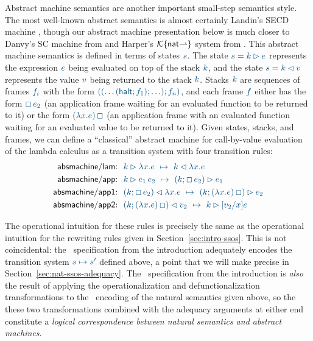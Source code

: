 Abstract machine semantics are another important small-step semantics
style. The most well-known abstract semantics is almost certainly
Landin's SECD machine \cite{landin64mechanical}, though our abstract
machine presentation below is much closer to Danvy's SC machine from
\cite{danvy03rational} and Harper's $\mathcal K\{{\sf
  nat}{\rightharpoonup}\}$ system from \cite[Chapter
27]{harper12practical}.  This abstract machine semantics is defined in
terms of states $\obj{s}$. The state $\obj{s} = \obj{k \rhd e}$
represents the expression $\obj{e}$ being evaluated on top of the
stack $\obj{k}$, and the state $\obj{s} = \obj{k \lhd v}$ represents
the value $\obj{v}$ being returned to the stack $\obj{k}$. Stacks
$\obj{k}$ are sequences of frames $\obj{f_i}$ with the form $\obj{((\ldots({\sf
  halt}; f_1); \ldots); f_n)}$, and each frame $\obj{f}$ either has the form
$\obj{\Box\,e_2}$ (an application frame waiting for an evaluated function to
be returned to it) or the form $\obj{(\lambda x.e)\,\Box}$ (an application
frame with an evaluated function waiting for an evaluated value to be
returned to it). Given states, stacks, and frames, we can define a
``classical'' abstract machine for call-by-value evaluation of the
lambda calculus as a transition system with four transition rules:
\begin{align*}
{\sf absmachine/lam}{:} & ~~ 
 \obj{k \rhd \lambda x.e ~ \mapsto ~ k \lhd \lambda x.e}
\\
{\sf absmachine/app}{:} & ~~ 
 \obj{k \rhd e_1\,e_2 ~ \mapsto ~ (k; \Box\,e_2) \rhd e_1}
\\
{\sf absmachine/app1}{:} & ~~ 
 \obj{(k; \Box\,e_2) \lhd \lambda x.e ~ 
   \mapsto ~ (k; (\lambda x.e)\,\Box) \rhd e_2}
\\
{\sf absmachine/app2}{:} & ~~
 \obj{(k; (\lambda x.e)\,\Box) \lhd v_2 ~ \mapsto ~ k \rhd [v_2/x]e}
\end{align*}

The operational intuition for these rules is precisely the same as the
operational intuition for the rewriting rules given in
Section~\ref{sec:intro-ssos}. This is not coincidental: the
\sls~specification from the introduction adequately encodes the
transition system $\obj{s \mapsto s'}$ defined above, a point that we will
make precise in Section~\ref{sec:nat-ssos-adequacy}. The
\sls~specification from the introduction is {\it also} the result of
applying the operationalization and defunctionalization
transformations to the \sls~encoding of the natural semantics given
above, so the these two transformations combined with the adequacy
arguments at either end constitute a {\it logical correspondence between
natural semantics and abstract machines}. 

